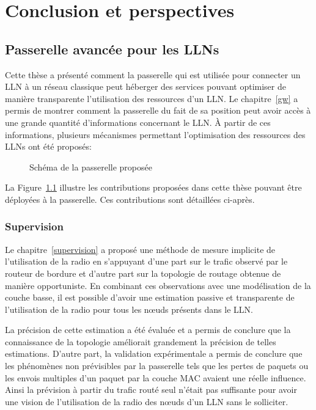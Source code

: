 
\chapter{Conclusion et perspectives}
\label{conclusion}

\section{Passerelle avancée pour les \ac{LLN}s}

Cette thèse a présenté comment la passerelle qui est utilisée pour connecter un \ac{LLN} à un réseau classique peut héberger des services pouvant optimiser de manière transparente l'utilisation des ressources d'un \ac{LLN}.
Le chapitre~\ref{gw} a permis de montrer comment la passerelle du fait de sa position peut avoir accès à une grande quantité d'informations concernant le \ac{LLN}.
À partir de ces informations, plusieurs mécanismes permettant l'optimisation des ressources des \ac{LLN}s ont été proposés:

\begin{figure}[ht]
  \centering
  
  \caption{Schéma de la passerelle proposée}
  \label{conclusion:schema}
\end{figure}

La Figure~\ref{conclusion:schema} illustre les contributions proposées dans cette thèse pouvant être déployées à la passerelle.
Ces contributions sont détaillées ci-après.

\subsection{Supervision}

Le chapitre~\ref{supervision} a proposé une méthode de mesure implicite de l'utilisation de la radio en s'appuyant d'une part sur le trafic observé par le routeur de bordure et d'autre part sur la topologie de routage obtenue de manière opportuniste.
En combinant ces observations avec une modélisation de la couche basse, il est possible d'avoir une estimation passive et transparente de l'utilisation de la radio pour tous les nœuds présents dans le \ac{LLN}.

La précision de cette estimation a été évaluée et a permis de conclure que la connaissance de la topologie améliorait grandement la précision de telles estimations.
D'autre part, la validation expérimentale a permis de conclure que les phénomènes non prévisibles par la passerelle tels que les pertes de paquets ou les envois multiples d'un paquet par la couche MAC avaient une réelle influence.
Ainsi la prévision à partir du trafic routé seul n'était pas suffisante pour avoir une vision de l'utilisation de la radio des nœuds d'un \ac{LLN} sans le solliciter.

